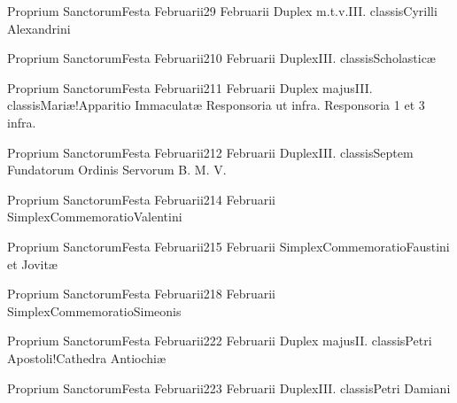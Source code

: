 \documentclass[liber-responsorialis_sanctorale.tex]{subfiles}
\begin{document}
	{Proprium Sanctorum}{Festa Februarii}{2}{9 Februarii}
	{Duplex m.t.v.}{III. classis}{Cyrilli Alexandrini}
	{\copodorubric}
	{\respdetemp}

	{Proprium Sanctorum}{Festa Februarii}{2}{10 Februarii}
	{Duplex}{III. classis}{Scholasticæ}
	{\vnrubric}
	{\respdetemp}

	{Proprium Sanctorum}{Festa Februarii}{2}{11 Februarii}
	{Duplex majus}{III. classis}{Mariæ!Apparitio Immaculatæ}
	{Responsoria ut infra.}
	{Responsoria 1 et 3 infra.}

	{Proprium Sanctorum}{Festa Februarii}{2}{12 Februarii}
	{Duplex}{III. classis}{Septem Fundatorum Ordinis Servorum B. M. V.}
	{\conprubric}
	{\respdetemp}

	{Proprium Sanctorum}{Festa Februarii}{2}{14 Februarii}
	{Simplex}{Commemoratio}{Valentini}
	{}
	{}
\rubric{\respdetemp}

	{Proprium Sanctorum}{Festa Februarii}{2}{15 Februarii}
	{Simplex}{Commemoratio}{Faustini et Jovitæ}
	{}
	{}
\rubric{\respdetemp}

	{Proprium Sanctorum}{Festa Februarii}{2}{18 Februarii}
	{Simplex}{Commemoratio}{Simeonis}
	{}
	{}
\rubric{\respdetemp}

	{Proprium Sanctorum}{Festa Februarii}{2}{22 Februarii}
	{Duplex majus}{II. classis}{Petri Apostoli!Cathedra Antiochiæ}
	{}
	{}

	{Proprium Sanctorum}{Festa Februarii}{2}{23 Februarii}
	{Duplex}{III. classis}{Petri Damiani}
	{\copodorubric}
	{\respdetemp}
\end{document}
